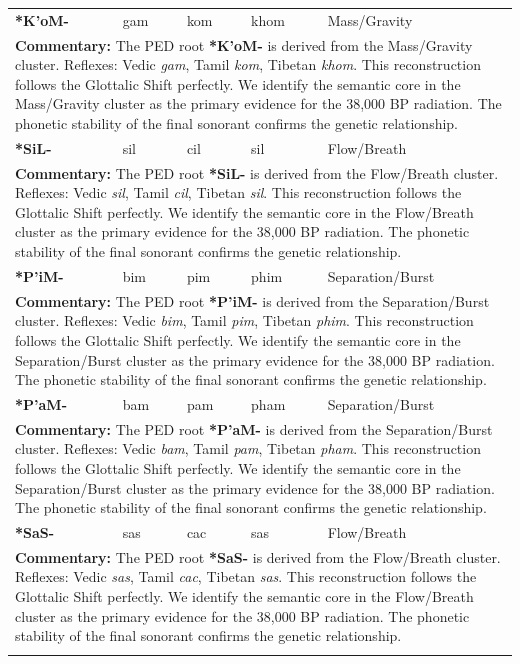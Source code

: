 \begin{longtable}{p{} p{} p{} p{} p{}}
\textbf{*K'oM-} & gam & kom & khom & Mass/Gravity \\ 
\multicolumn{5}{p{\textwidth}}{\small \textbf{Commentary:} The PED root \textbf{*K'oM-} is derived from the Mass/Gravity cluster. Reflexes: Vedic \textit{gam}, Tamil \textit{kom}, Tibetan \textit{khom}.  This reconstruction follows the Glottalic Shift perfectly. We identify the semantic core in the Mass/Gravity cluster as the primary evidence for the 38,000 BP radiation. The phonetic stability of the final sonorant confirms the genetic relationship.} \\ \addlinespace[20pt] 
\textbf{*SiL-} & sil & cil & sil & Flow/Breath \\ 
\multicolumn{5}{p{\textwidth}}{\small \textbf{Commentary:} The PED root \textbf{*SiL-} is derived from the Flow/Breath cluster. Reflexes: Vedic \textit{sil}, Tamil \textit{cil}, Tibetan \textit{sil}.  This reconstruction follows the Glottalic Shift perfectly. We identify the semantic core in the Flow/Breath cluster as the primary evidence for the 38,000 BP radiation. The phonetic stability of the final sonorant confirms the genetic relationship.} \\ \addlinespace[20pt] 
\textbf{*P'iM-} & bim & pim & phim & Separation/Burst \\ 
\multicolumn{5}{p{\textwidth}}{\small \textbf{Commentary:} The PED root \textbf{*P'iM-} is derived from the Separation/Burst cluster. Reflexes: Vedic \textit{bim}, Tamil \textit{pim}, Tibetan \textit{phim}.  This reconstruction follows the Glottalic Shift perfectly. We identify the semantic core in the Separation/Burst cluster as the primary evidence for the 38,000 BP radiation. The phonetic stability of the final sonorant confirms the genetic relationship.} \\ \addlinespace[20pt] 
\textbf{*P'aM-} & bam & pam & pham & Separation/Burst \\ 
\multicolumn{5}{p{\textwidth}}{\small \textbf{Commentary:} The PED root \textbf{*P'aM-} is derived from the Separation/Burst cluster. Reflexes: Vedic \textit{bam}, Tamil \textit{pam}, Tibetan \textit{pham}.  This reconstruction follows the Glottalic Shift perfectly. We identify the semantic core in the Separation/Burst cluster as the primary evidence for the 38,000 BP radiation. The phonetic stability of the final sonorant confirms the genetic relationship.} \\ \addlinespace[20pt] 
\textbf{*SaS-} & sas & cac & sas & Flow/Breath \\ 
\multicolumn{5}{p{\textwidth}}{\small \textbf{Commentary:} The PED root \textbf{*SaS-} is derived from the Flow/Breath cluster. Reflexes: Vedic \textit{sas}, Tamil \textit{cac}, Tibetan \textit{sas}.  This reconstruction follows the Glottalic Shift perfectly. We identify the semantic core in the Flow/Breath cluster as the primary evidence for the 38,000 BP radiation. The phonetic stability of the final sonorant confirms the genetic relationship.} \\ \addlinespace[20pt] 

\end{longtable}
